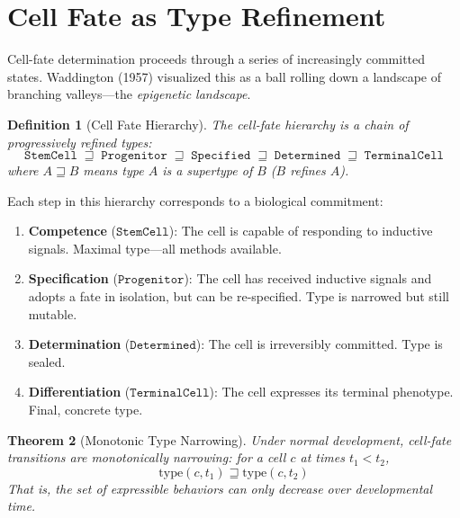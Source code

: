 \documentclass[12pt,a4paper]{article}
\newtheorem{theorem}{Theorem}[section]
\newtheorem{definition}[theorem]{Definition}
\newcommand{\StemCell}{\texttt{StemCell}}
\newcommand{\TermCell}{\texttt{TerminalCell}}
\begin{document}
\section{Cell Fate as Type Refinement}\label{sec:cellfate}

Cell-fate determination proceeds through a series of increasingly
committed states.  Waddington (1957) visualized this as a ball
rolling down a landscape of branching valleys---the
\emph{epigenetic landscape}.

\begin{definition}[Cell Fate Hierarchy]\label{def:fate-hierarchy}
The cell-fate hierarchy is a chain of progressively refined types:
\[
  \StemCell \;\sqsupseteq\; \texttt{Progenitor} \;\sqsupseteq\;
  \texttt{Specified} \;\sqsupseteq\; \texttt{Determined} \;\sqsupseteq\;
  \TermCell
\]
where $A \sqsupseteq B$ means type $A$ is a supertype of $B$
($B$ refines $A$).
\end{definition}

Each step in this hierarchy corresponds to a biological commitment:

\begin{enumerate}[leftmargin=2em]
  \item \textbf{Competence} ($\StemCell$): The cell is capable of
    responding to inductive signals.  Maximal type---all methods
    available.
  \item \textbf{Specification} ($\texttt{Progenitor}$): The cell
    has received inductive signals and adopts a fate in isolation,
    but can be re-specified.  Type is narrowed but still mutable.
  \item \textbf{Determination} ($\texttt{Determined}$): The cell
    is irreversibly committed.  Type is sealed.
  \item \textbf{Differentiation} ($\TermCell$): The cell expresses
    its terminal phenotype.  Final, concrete type.
\end{enumerate}

\begin{theorem}[Monotonic Type Narrowing]\label{thm:monotonic-narrow}
Under normal development, cell-fate transitions are \emph{monotonically
narrowing}: for a cell $c$ at times $t_1 < t_2$,
\[
  \text{type}(c, t_1) \sqsupseteq \text{type}(c, t_2)
\]
That is, the set of expressible behaviors can only decrease over
developmental time.
\end{theorem}
\end{document}
